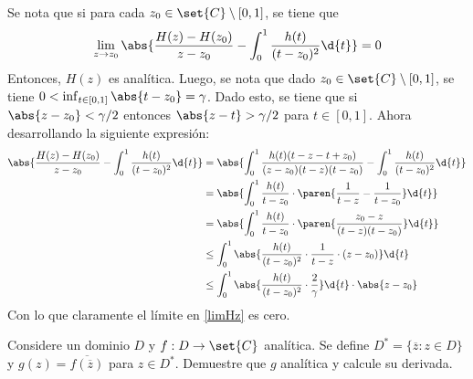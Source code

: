 \documentclass{homework}
\begin{document}
\begin{sol}
    Se nota que si para cada \(z_0\in\set{C}\setminus[0,1]\), se tiene que
    \begin{equation}
        \lim_{z\rightarrow z_0}\abs{\frac{H(z)-H(z_0)}{z-z_0}-\int_0^1\frac{h(t)}{(t-z_0)^2}\d{t}}=0\label{limHz}
    \end{equation}
    Entonces, \(H(z)\) es analítica. Luego, se nota que dado \(z_0\in\set{C}\setminus[0,1]\), se tiene \(0<\inf_{t\in[0,1]}\abs{t-z_0}=\gamma\). Dado esto, se tiene que si \(\abs{z-z_0}<\gamma/2\) entonces \(\abs{z-t}>\gamma/2\) para \(t\in[0,1]\). Ahora desarrollando la siguiente expresión:
    \begin{align*}
        \abs{\frac{H(z)-H(z_0)}{z-z_0}-\int_0^1\frac{h(t)}{(t-z_0)^2}\d{t}} & =\abs{\int_0^1\frac{h(t)(t-z-t+z_0)}{(z-z_0)(t-z)(t-z_0)}-\int_0^1\frac{h(t)}{(t-z_0)^2}\d{t}} \\
                                                                            & =\abs{\int_0^1\frac{h(t)}{t-z_0}\cdot\paren{\frac1{t-z}-\frac1{t-z_0}}\d{t}}                   \\
                                                                            & =\abs{\int_0^1\frac{h(t)}{t-z_0}\cdot\paren{\frac{z_0-z}{(t-z)(t-z_0)}}\d{t}}                  \\
                                                                            & \leq\int_0^1\abs{\frac{h(t)}{(t-z_0)^2}\cdot\frac1{t-z}\cdot(z-z_0)}\d{t}                      \\
                                                                            & \leq\int_0^1\abs{\frac{h(t)}{(t-z_0)^2}\cdot\frac2\gamma}\d{t}\cdot\abs{z-z_0}
    \end{align*}
    Con lo que claramente el límite en \eqref{limHz} es cero.
\end{sol}

\begin{prob}
    Considere un dominio \(D\) y \(f:D\rightarrow\set{C}\) analítica. Se define \(D^*=\{\overline{z}:z\in D\}\) y \(g(z)=\overline{f(\overline{z})}\) para \(z\in D^*\). Demuestre que \(g\) analítica y calcule su derivada.
\end{prob}
\end{document}
